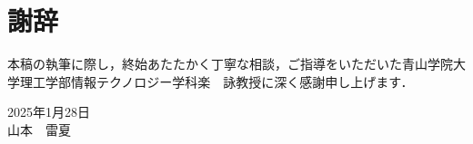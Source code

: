 \chapter*{謝辞}
本稿の執筆に際し，終始あたたかく丁寧な相談，ご指導をいただいた青山学院大学理工学部情報テクノロジー学科楽　詠教授に深く感謝申し上げます．


\begin{flushright}
2025年1月28日
\\
山本　雷夏
\end{flushright}
